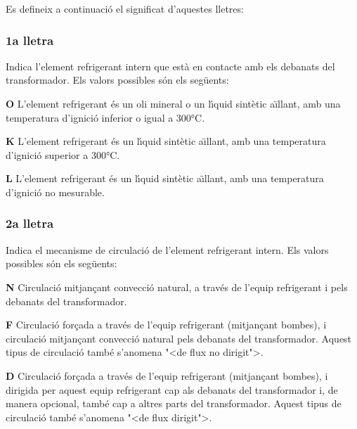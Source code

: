 Es defineix a continuaci\'{o} el significat d'aquestes lletres:

\subsubsection*{1a lletra}
Indica l'element refrigerant intern que est\`{a} en
contacte amb els debanats del transformador. Els valors possibles
s\'{o}n els seg\"{u}ents:
\begin{list}{}
   {\setlength{\labelwidth}{10mm} \setlength{\leftmargin}{10mm} \setlength{\labelsep}{2mm}}
   \item[\textbf{O}] L'element refrigerant \'{e}s un oli mineral o un l\'{\i}quid sint\`{e}tic a\"{\i}llant, amb una temperatura d'ignici\'{o}
   inferior o igual a 300\unit{\celsius}.
   \item[\textbf{K}] L'element refrigerant \'{e}s un l\'{\i}quid sint\`{e}tic a\"{\i}llant, amb una temperatura d'ignici\'{o}
   superior a 300\unit{\celsius}.
   \item[\textbf{L}] L'element refrigerant \'{e}s un l\'{\i}quid sint\`{e}tic a\"{\i}llant, amb una temperatura d'ignici\'{o}
   no mesurable.
\end{list}
  

\subsubsection*{2a lletra}
Indica el mecanisme de circulaci\'{o} de l'element
refrigerant intern. Els valors possibles s\'{o}n els seg\"{u}ents:
\begin{list}{}
   {\setlength{\labelwidth}{10mm} \setlength{\leftmargin}{10mm} \setlength{\labelsep}{2mm}}
   \item[\textbf{N}] Circulaci\'{o} mitjan\c{c}ant convecci\'{o} natural,
    a trav\'{e}s de l'equip refrigerant i pels debanats del transformador.
   \item[\textbf{F}] Circulaci\'{o} for\c{c}ada a trav\'{e}s de l'equip refrigerant (mitjan\c{c}ant bombes),
    i circulaci\'{o} mitjan\c{c}ant convecci\'{o} natural pels debanats del
    transformador. Aquest tipus de circulaci\'{o} tamb\'{e} s'anomena {"<}de flux no
    dirigit{">}.
   \item[\textbf{D}] Circulaci\'{o} for\c{c}ada a trav\'{e}s de l'equip refrigerant (mitjan\c{c}ant bombes),
    i dirigida per aquest equip refrigerant cap als debanats del
    transformador i, de manera opcional, tamb\'{e} cap a altres parts del transformador. Aquest
    tipus de circulaci\'{o} tamb\'{e} s'anomena {"<}de flux dirigit{">}.
\end{list}
  

